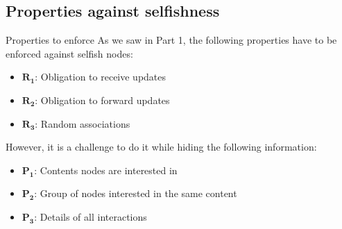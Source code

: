 \documentclass[10pt]{beamer}
\begin{document}
\subsection{Properties against selfishness}
\begin{frame}{Properties to enforce}{}
   As we saw in Part 1, the following properties have to be enforced against selfish nodes:
     \begin{itemize}
        \item $\mathbf{R_1}$: Obligation to receive updates
        \item $\mathbf{R_2}$: Obligation to forward updates
        \item $\mathbf{R_3}$: Random associations
     \end{itemize}
   \vspace{5mm}
   However, it is a challenge to do it while hiding the following information:
   \begin{itemize}
        \item $\mathbf{P_1}$: Contents nodes are interested in
        \item $\mathbf{P_2}$: Group of nodes interested in the same content
        \item $\mathbf{P_3}$: Details of all interactions
   \end{itemize}
   
\end{frame}
\end{document}
